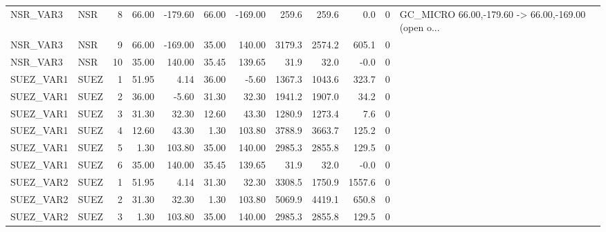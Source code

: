 \begin{tabular}{llrrrrrrrrrl}
 NSR\_VAR3 &      NSR &        8 &     66.00 &   -179.60 &   66.00 & -169.00 &   259.6 &  259.6 &              0.0 &           0 & GC\_MICRO 66.00,-179.60 -> 66.00,-169.00 (open o... \\
 NSR\_VAR3 &      NSR &        9 &     66.00 &   -169.00 &   35.00 &  140.00 &  3179.3 & 2574.2 &            605.1 &           0 &                                                    \\
 NSR\_VAR3 &      NSR &       10 &     35.00 &    140.00 &   35.45 &  139.65 &    31.9 &   32.0 &             -0.0 &           0 &                                                    \\
SUEZ\_VAR1 &     SUEZ &        1 &     51.95 &      4.14 &   36.00 &   -5.60 &  1367.3 & 1043.6 &            323.7 &           0 &                                                    \\
SUEZ\_VAR1 &     SUEZ &        2 &     36.00 &     -5.60 &   31.30 &   32.30 &  1941.2 & 1907.0 &             34.2 &           0 &                                                    \\
SUEZ\_VAR1 &     SUEZ &        3 &     31.30 &     32.30 &   12.60 &   43.30 &  1280.9 & 1273.4 &              7.6 &           0 &                                                    \\
SUEZ\_VAR1 &     SUEZ &        4 &     12.60 &     43.30 &    1.30 &  103.80 &  3788.9 & 3663.7 &            125.2 &           0 &                                                    \\
SUEZ\_VAR1 &     SUEZ &        5 &      1.30 &    103.80 &   35.00 &  140.00 &  2985.3 & 2855.8 &            129.5 &           0 &                                                    \\
SUEZ\_VAR1 &     SUEZ &        6 &     35.00 &    140.00 &   35.45 &  139.65 &    31.9 &   32.0 &             -0.0 &           0 &                                                    \\
SUEZ\_VAR2 &     SUEZ &        1 &     51.95 &      4.14 &   31.30 &   32.30 &  3308.5 & 1750.9 &           1557.6 &           0 &                                                    \\
SUEZ\_VAR2 &     SUEZ &        2 &     31.30 &     32.30 &    1.30 &  103.80 &  5069.9 & 4419.1 &            650.8 &           0 &                                                    \\
SUEZ\_VAR2 &     SUEZ &        3 &      1.30 &    103.80 &   35.00 &  140.00 &  2985.3 & 2855.8 &            129.5 &           0 &                                                    \\

\end{tabular}
